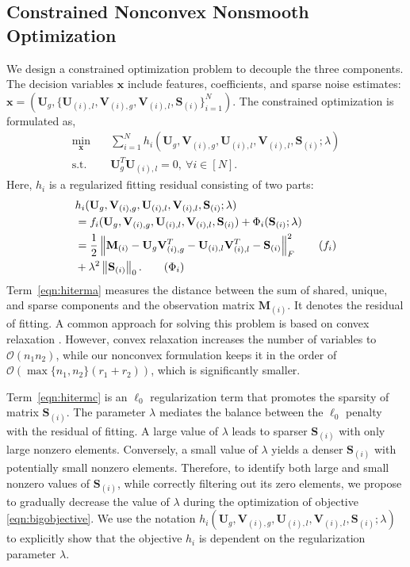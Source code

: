 \documentclass[twoside,11pt]{article}
\newcommand{\norm}[1]{\left\lVert#1\right\rVert}
\newcommand{\matM}{\mathbf{M}}
\newcommand{\matS}{\mathbf{S}}
\newcommand{\matU}{\mathbf{U}}
\newcommand{\matV}{\mathbf{V}}
\newcommand{\vecx}{\mathbf{x}}
\newcommand{\fracud}{\frac{1}{2}}
\begin{document}
\subsection{Constrained Nonconvex Nonsmooth Optimization}
\label{sec:optformulation}
We design a constrained optimization problem to decouple the three components. The decision variables $\vecx$ include features, coefficients, and sparse noise estimates: $\vecx = \left(\matU_g,\{\matU_{(i),l},\matV_{(i),g},\matV_{(i),l},\matS_{(i)}\}_{i=1}^N\right)$. The constrained optimization is formulated as,
\begin{equation}
\label{eqn:bigobjective}
\begin{aligned}
\min_{\vecx} & \quad\sum_{i=1}^Nh_i(\matU_g,\matV_{(i),g},\matU_{(i),l},\matV_{(i),l},\matS_{(i)};\lambda)\\
\text{s.t.} &\quad \matU_g^T\matU_{(i),l}=0, \ \forall i\in[N] .
\end{aligned}
\end{equation}
Here, $h_i$ is a regularized fitting residual consisting of two parts:
\begin{subequations}
\label{eqn:hidef}
\begin{align}
&h_i(\matU_g,\matV_{(i),g},\matU_{(i),l},\matV_{(i),l},\matS_{(i)};\lambda)\notag \\
&=f_i(\matU_g,\matV_{(i),g},\matU_{(i),l},\matV_{(i),l},\matS_{(i)})+\Phi_i(\matS_{(i)};\lambda)\notag\\
    &=\fracud\norm{\matM_{(i)}-\matU_g\matV_{(i),g}^T-\matU_{(i),l}\matV_{(i),l}^T-\matS_{(i)}}_F^2   \label{eqn:hiterma}\tag{$f_i$}\\
    &+\lambda^2\norm{\matS_{(i)}}_0. \label{eqn:hitermc}\tag{$\Phi_i$}
\end{align}
\end{subequations} 
Term~\eqref{eqn:hiterma} measures the distance between the sum of shared, unique, and sparse components and the observation matrix $\matM_{(i)}$. It denotes the residual of fitting. A common approach for solving this problem is based on convex relaxation \citep{robustpca}. However, convex relaxation increases the number of variables to $\mathcal{O}(n_1n_2)$, while our nonconvex formulation keeps it in the order of $\mathcal{O}(\max\{n_1,n_2\}(r_1+r_2))$, which is significantly smaller. 

Term~\eqref{eqn:hitermc} is an $\ell_0$ regularization term that promotes the sparsity of matrix $\matS_{(i)}$. The parameter $\lambda$ mediates the balance between the $\ell_0$ penalty with the residual of fitting. A large value of $\lambda$ leads to sparser $\matS_{(i)}$ with only large nonzero elements. Conversely, a small value of $\lambda$ yields a denser $\matS_{(i)}$ with potentially small nonzero elements. Therefore, to identify both large and small nonzero values of $\matS_{(i)}$, while correctly filtering out its zero elements, we propose to gradually decrease the value of $\lambda$ during the optimization of objective \eqref{eqn:bigobjective}. We use the notation $h_i(\matU_g,\matV_{(i),g},\matU_{(i),l},\matV_{(i),l},\matS_{(i)};\lambda)$ to explicitly show that the objective $h_i$ is dependent on the regularization parameter $\lambda$.
\end{document}
